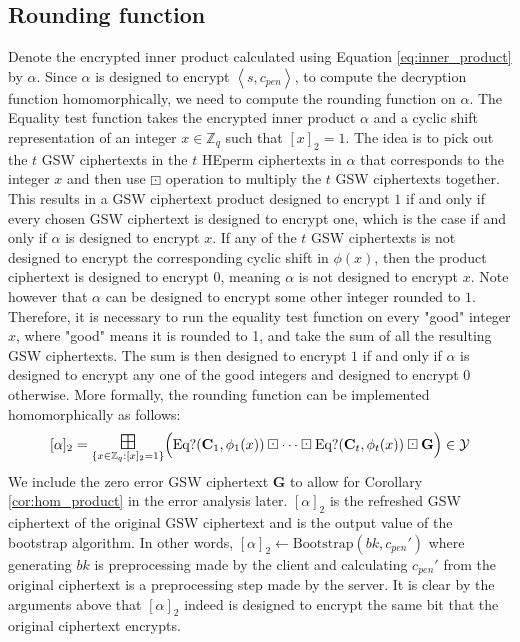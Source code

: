 \subsection*{Rounding function}
Denote the encrypted inner product calculated using Equation \ref{eq:inner_product} by $\alpha$. Since $\alpha$ is designed to encrypt $\left \langle s, c_{pen} \right \rangle$, to compute the decryption function homomorphically, we need to compute the rounding function on $\alpha$. The Equality test function takes the encrypted inner product $\alpha$ and a cyclic shift representation of an integer $x \in \mathbb{Z}_q$ such that $[x]_2 = 1$. The idea is to pick out the $t$ GSW ciphertexts in the $t$ HEperm ciphertexts in $\alpha$ that corresponds to the integer $x$ and then use $\boxdot$ operation to multiply the $t$ GSW ciphertexts together. This results in a GSW ciphertext product designed to encrypt $1$ if and only if every chosen GSW ciphertext is designed to encrypt one, which is the case if and only if $\alpha$ is designed to encrypt $x$. If any of the $t$ GSW ciphertexts is not designed to encrypt the corresponding cyclic shift in $\phi(x)$, then the product ciphertext is designed to encrypt 0, meaning $\alpha$ is not designed to encrypt $x$. Note however that $\alpha$ can be designed to encrypt some other integer rounded to $1$. Therefore, it is necessary to run the equality test function on every "good" integer $x$, where "good" means it is rounded to 1, and take the sum of all the resulting GSW ciphertexts. The sum is then designed to encrypt $1$ if and only if $\alpha$ is designed to encrypt any one of the good integers and designed to encrypt $0$ otherwise. More formally, the rounding function can be implemented homomorphically as follows:
\begin{equation}\label{eq:rounding_function}
    [\alpha]_2 = \bigboxplus\limits_{\{x \in \mathbb{Z}_q: [x]_2 = 1\}} \Bigl( \text{Eq?}(\mathbf{C}_1, \phi_1(x)) \boxdot \dots \boxdot \text{Eq?}(\mathbf{C}_t, \phi_t(x)) \boxdot \mathbf{G} \Bigr) \in \mathcal{Y}
\end{equation}
We include the zero error GSW ciphertext $\mathbf{G}$ to allow for Corollary \ref{cor:hom_product} in the error analysis later. $[\alpha]_2$ is the refreshed GSW ciphertext of the original GSW ciphertext and is the output value of the bootstrap algorithm. In other words, $[\alpha]_2 \leftarrow \text{Bootstrap}(bk,c_{pen}')$ where generating $bk$ is preprocessing made by the client and calculating $c_{pen}'$ from the original ciphertext is a preprocessing step made by the server. It is clear by the arguments above that $[\alpha]_2$ indeed is designed to encrypt the same bit that the original ciphertext encrypts.

